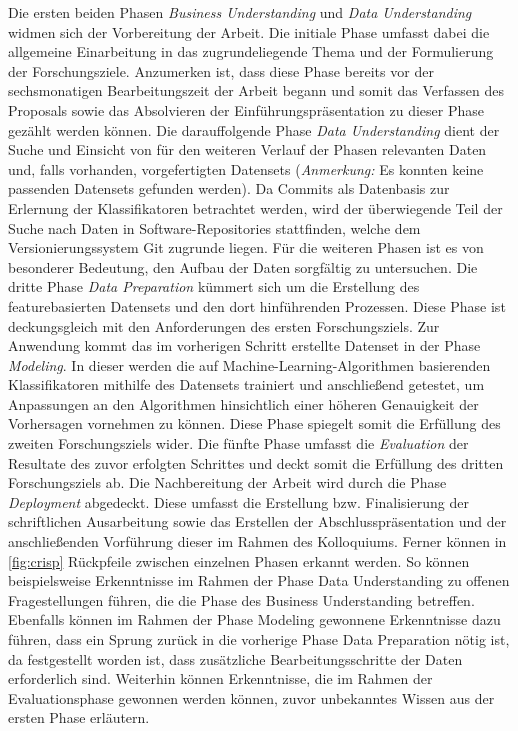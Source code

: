 Die ersten beiden Phasen \emph{Business Understanding} und \emph{Data Understanding} widmen sich der Vorbereitung der Arbeit. Die initiale Phase umfasst dabei die allgemeine Einarbeitung in das zugrundeliegende Thema und der Formulierung der Forschungsziele. Anzumerken ist, dass diese Phase bereits vor der sechsmonatigen Bearbeitungszeit der Arbeit begann und somit das Verfassen des Proposals sowie das Absolvieren der Einführungspräsentation zu dieser Phase gezählt werden können. Die darauffolgende Phase \emph{Data Understanding} dient der Suche und Einsicht von für den weiteren Verlauf der Phasen relevanten Daten und, falls vorhanden, vorgefertigten Datensets (\textit{Anmerkung:} Es konnten keine passenden Datensets gefunden werden). Da Commits als Datenbasis zur Erlernung der Klassifikatoren betrachtet werden, wird der überwiegende Teil der Suche nach Daten in Software-Repositories stattfinden, welche dem Versionierungssystem Git zugrunde liegen. Für die weiteren Phasen ist es von besonderer Bedeutung, den Aufbau der Daten sorgfältig zu untersuchen. Die dritte Phase \emph{Data Preparation} kümmert sich um die Erstellung des featurebasierten Datensets und den dort hinführenden Prozessen. Diese Phase ist deckungsgleich mit den Anforderungen des ersten Forschungsziels. Zur Anwendung kommt das im vorherigen Schritt erstellte Datenset in der Phase \emph{Modeling}. In dieser werden die auf Machine-Learning-Algorithmen basierenden Klassifikatoren mithilfe des Datensets trainiert und anschließend getestet, um Anpassungen an den Algorithmen hinsichtlich einer höheren Genauigkeit der Vorhersagen vornehmen zu können. Diese Phase spiegelt somit die Erfüllung des zweiten Forschungsziels wider. Die fünfte Phase umfasst die \emph{Evaluation} der Resultate des zuvor erfolgten Schrittes und deckt somit die Erfüllung des dritten Forschungsziels ab. Die Nachbereitung der Arbeit wird durch die Phase \emph{Deployment} abgedeckt. Diese umfasst die Erstellung bzw. Finalisierung der schriftlichen Ausarbeitung sowie das Erstellen der Abschlusspräsentation und der anschließenden Vorführung dieser im Rahmen des Kolloquiums.
Ferner können in \autoref{fig:crisp} Rückpfeile zwischen einzelnen Phasen erkannt werden. So können beispielsweise Erkenntnisse im Rahmen der Phase Data Understanding zu offenen Fragestellungen führen, die die Phase des Business Understanding betreffen. Ebenfalls können im Rahmen der Phase Modeling gewonnene Erkenntnisse dazu führen, dass ein Sprung zurück in die vorherige Phase Data Preparation nötig ist, da festgestellt worden ist, dass zusätzliche Bearbeitungsschritte der Daten erforderlich sind. Weiterhin können Erkenntnisse, die im Rahmen der Evaluationsphase gewonnen werden können, zuvor unbekanntes Wissen aus der ersten Phase erläutern.

